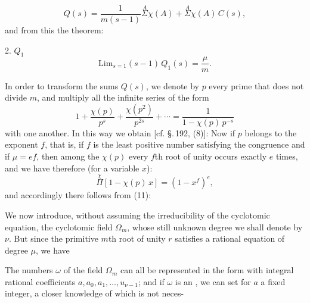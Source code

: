 \[
Q(s) = \frac{1}{m(s-1)} \overset{A}{\Sigma} \chi(A) + \overset{A}{\Sigma} \chi(A)\, C(s),
\]
and from this the theorem:

2. 
$Q_1$ 
\[
\mathrm{Lim}_{s=1} (s-1)\, Q_1(s) = \frac{\mu}{m}.
\]

In order to transform the sums $Q(s)$, we denote by $p$ every prime that does
not divide $m$, and multiply all the infinite series of the form
\[
1 + \frac{\chi(p)}{p^s} + \frac{\chi(p^2)}{p^{2s}} + \cdots
= \frac{1}{1 - \chi(p)\, p^{-s}}
\]
with one another. In this way we obtain [cf. \S.\,192, (8)]:
Now if $p$ belongs to the exponent $f$, that is, if $f$ is the least positive
number satisfying the congruence
and if $\mu = ef$, then among the $\chi(p)$ every $f$th root of unity occurs
exactly $e$ times, and we have therefore (for a variable $x$):
\[
\overset{\chi}{\Pi} [1 - \chi(p)\, x] = (1 - x^f)^e,
\]
and accordingly there follows from (11):

We now introduce, without assuming the irreducibility of the cyclotomic
equation, the cyclotomic field $\Omega_m$, whose still unknown degree we shall
denote by $\nu$. But since the primitive $m$th root of unity $r$ satisfies a
rational equation of degree $\mu$, we have

The numbers $\omega$ of the field $\Omega_m$ can all be represented in the form
with integral rational coefficients $a, a_0, a_1, \ldots, u_{\nu-1}$; %
and if
$\omega$ is an , we can set for $a$ a fixed integer, a closer
knowledge of which is not neces-
